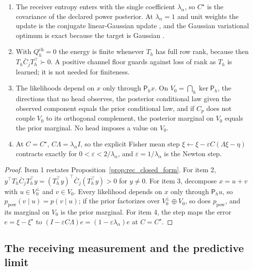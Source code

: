 \documentclass[twoside,11pt]{article}
\begin{document}
\begin{corollary}
\label{cor:rec_properties}
\begin{enumerate}
\item The receiver entropy enters with the single coefficient $\lambda_\alpha$, so $C^\star$ is the covariance of the declared power posterior. At $\lambda_\alpha=1$ and unit weights the update is the conjugate linear-Gaussian update \citep[Sec.~2.3.3]{Bishop2006}, and the Gaussian variational optimum is exact because the target is Gaussian \citep{OpperArchambeau2009}.
\item With $Q_h^{\mathrm{ch}}=0$ the energy is finite whenever $T_h$ has full row rank, because then $T_h\bar C_jT_h^\top\succ0$. A positive channel floor guards against loss of rank as $T_h$ is learned; it is not needed for finiteness.
\item The likelihoods depend on $x$ only through $\mathsf P_hx$. On $V_0=\bigcap_h\ker\mathsf P_h$, the directions that no head observes, the posterior conditional law given the observed component equals the prior conditional law, and if $C_p$ does not couple $V_0$ to its orthogonal complement, the posterior marginal on $V_0$ equals the prior marginal. No head imposes a value on $V_0$.
\item At $C=C^\star$, $C\Lambda=\lambda_\alpha I$, so the explicit Fisher mean step $\xi\leftarrow\xi-\varepsilon C(\Lambda\xi-\eta)$ contracts exactly for $0<\varepsilon<2/\lambda_\alpha$, and $\varepsilon=1/\lambda_\alpha$ is the Newton step.
\end{enumerate}
\end{corollary}
\begin{proof}
Item 1 restates Proposition~\ref{prop:rec_closed_form}. For item 2, $y^\top T_h\bar C_jT_h^\top y=(T_h^\top y)^\top\bar C_j(T_h^\top y)>0$ for $y\ne0$. For item 3, decompose $x=u+v$ with $u\in V_0^\perp$ and $v\in V_0$. Every likelihood depends on $x$ only through $\mathsf P_hu$, so $p_{\mathrm{pow}}(v\mid u)=p(v\mid u)$; if the prior factorizes over $V_0^\perp\oplus V_0$, so does $p_{\mathrm{pow}}$, and its marginal on $V_0$ is the prior marginal. For item 4, the step maps the error $e=\xi-\xi^\star$ to $(I-\varepsilon C\Lambda)e=(1-\varepsilon\lambda_\alpha)e$ at $C=C^\star$.
\end{proof}

\subsection{The receiving measurement and the predictive limit}
\label{sec:rec_predictive_limit}
\end{document}

